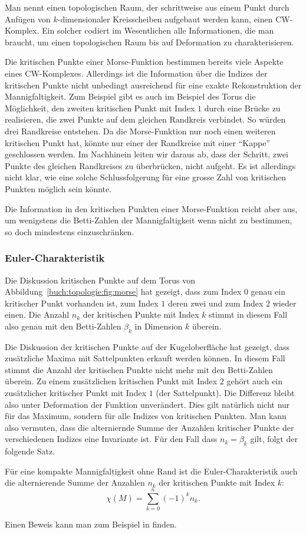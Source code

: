 Man nennt einen topologischen Raum, der schrittweise aus einem Punkt
durch Anfügen von $k$-dimensionaler Kreisscheiben aufgebaut werden kann,
einen CW-Komplex.
%
Ein solcher codiert im Wesentlichen alle Informationen, die man braucht,
um einen topologischen Raum bis auf Deformation zu charakterisieren.

Die kritischen Punkte einer Morse-Funktion bestimmen bereits viele
Aspekte eines CW-Komplexes.
Allerdings ist die Information über die Indizes der kritischen Punkte
nicht unbedingt ausreichend für eine exakte Rekonstruktion der
Mannigfaltigkeit.
Zum Beispiel gibt es auch im Beispiel des Torus die Möglichkeit,
den zweiten kritischen Punkt mit Index $1$ durch eine Brücke zu
realisieren, die zwei Punkte auf dem gleichen Randkreis verbindet.
So würden drei Randkreise entstehen.
Da die Morse-Funktion nur noch einen weiteren kritischen Punkt hat,
könnte nur einer der Randkreise mit einer ``Kappe'' geschlossen
werden.
Im Nachhinein leiten wir daraus ab, dass der Schritt, zwei Punkte des
gleichen Randkreises zu überbrücken, nicht aufgeht.
Es ist allerdings nicht klar, wie eine solche Schlussfolgerung
für eine grosse Zahl von kritischen Punkten möglich sein könnte.

Die Information in den kritischen Punkten einer Morse-Funktion reicht
aber aus, um wenigstens die Betti-Zahlen der Mannigfaltigkeit
wenn nicht zu bestimmen, so doch mindestens einzuschränken.

%
%
\subsubsection{Euler-Charakteristik}
Die Diskussion kritischen Punkte auf dem Torus von
Abbildung~\ref{buch:topologie:fig:morse} hat gezeigt,
dass zum Index $0$ genau ein kritischer Punkt vorhanden ist,
zum Index $1$ deren zwei und zum Index 2 wieder einen.
Die Anzahl $n_k$ der kritischen Punkte mit Index $k$ stimmt in diesem Fall
also genau mit den Betti-Zahlen $\beta_k$ in Dimension $k$ überein.

Die Diskussion der kritischen Punkte auf der Kugeloberfläche
hat gezeigt, dass zusätzliche Maxima mit Sattelpunkten erkauft werden
können.
In diesem Fall stimmt die Anzahl der kritischen Punkte nicht mehr
mit den Betti-Zahlen überein.
Zu einem zusätzlichen kritischen Punkt mit Index $2$ gehört auch
ein zusätzlicher kritischer Punkt mit Index $1$ (der Sattelpunkt).
Die Differenz bleibt also unter Deformation der Funktion unverändert.
Dies gilt natürlich nicht nur für das Maximum, sondern für alle Indizes
von kritischen Punkten.
Man kann also vermuten, dass die alterniernde Summe der Anzahlen
kritischer Punkte der verschiedenen Indizes eine Invariante ist.
Für den Fall dass $n_k=\beta_k$ gilt, folgt der folgende Satz.

\begin{satz}
Für eine kompakte Mannigfaltigkeit ohne Rand ist die Euler-Charakteristik
auch die alternierende Summe der Anzahlen $n_k$ der kritischen Punkte 
mit Index $k$:
\[
\chi(M)
=
\sum_{k=0}^n (-1)^k n_k.
\]
\end{satz}

Einen Beweis kann man zum Beispiel in \cite{buch:hirsch} finden.

